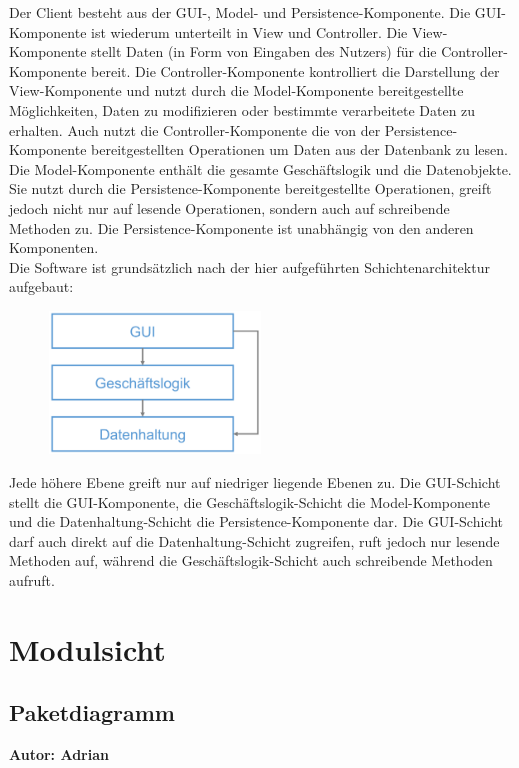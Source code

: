 \documentclass[fontsize=12pt,paper=a4,twoside]{scrartcl}
\begin{document}
Der Client besteht aus der GUI-, Model- und Persistence-Komponente. Die GUI-Komponente ist wiederum unterteilt in View und Controller. Die View-Komponente stellt Daten (in Form von Eingaben des Nutzers) für die Controller-Komponente bereit. Die Controller-Komponente kontrolliert die Darstellung der View-Komponente und nutzt durch die Model-Komponente bereitgestellte Möglichkeiten, Daten zu modifizieren oder bestimmte verarbeitete Daten zu erhalten. Auch nutzt die Controller-Komponente die von der Persistence-Komponente bereitgestellten Operationen um Daten aus der Datenbank zu lesen. Die Model-Komponente enthält die gesamte Geschäftslogik und die Datenobjekte. Sie nutzt durch die Persistence-Komponente bereitgestellte Operationen, greift jedoch nicht nur auf lesende Operationen, sondern auch auf schreibende Methoden zu. Die Persistence-Komponente ist unabhängig von den anderen Komponenten.\\

Die Software ist grundsätzlich nach der hier aufgeführten Schichtenarchitektur aufgebaut:

\begin{figure}[H]
\centering
\includegraphics[width=0.5\textwidth]{schichten.pdf}
\end{figure}

Jede höhere Ebene greift nur auf niedriger liegende Ebenen zu. Die GUI-Schicht stellt die GUI-Komponente, die Geschäftslogik-Schicht die Model-Komponente und die Datenhaltung-Schicht die Persistence-Komponente dar. Die GUI-Schicht darf auch direkt auf die Datenhaltung-Schicht zugreifen, ruft jedoch nur lesende Methoden auf, während die Geschäftslogik-Schicht auch schreibende Methoden aufruft.


\section{Modulsicht}
\label{sec:modulsicht}

\subsection{Paketdiagramm}
\textbf{Autor: Adrian}\\
\end{document}
